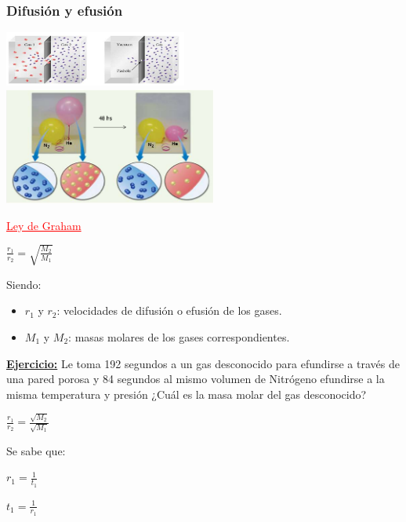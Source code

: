         \subsubsection{Difusión y efusión}
            \begin{center}
                \includegraphics[width=6cm]{./imagenes/difusionEfusion1.png} \\
                \includegraphics[width=7cm]{./imagenes/difusionEfusion2.png}
            \end{center}
            \begin{center} \textcolor{red}{\underline{Ley de Graham}} \end{center}
            \begin{center}  $\frac{r_1}{r_2} = \sqrt{\frac{M_2}{M_1}}$ \end{center}
            \sangria{} Siendo:
            \begin{itemize}
                \item $r_1$ y $r_2$: velocidades de difusión o efusión de los gases.
                \item $M_1$ y $M_2$: masas molares de los gases correspondientes.
            \end{itemize}
            \underline{\textbf{Ejercicio:}} Le toma 192 segundos a un gas desconocido para efundirse a través de una pared porosa y 84 segundos al mismo volumen de Nitrógeno efundirse a la misma temperatura y presión ¿Cuál es la masa molar del gas desconocido?
            \begin{center} 
                $\frac{r_1}{r_2} = \frac{\sqrt{M_2}}{\sqrt{M_1}}$ \\[5pt]
            \end{center}
            Se sabe que:
            \begin{center} $r_1 = \frac{1}{t_1}$ \end{center}
            \begin{center} $t_1 = \frac{1}{r_1}$ \end{center}
